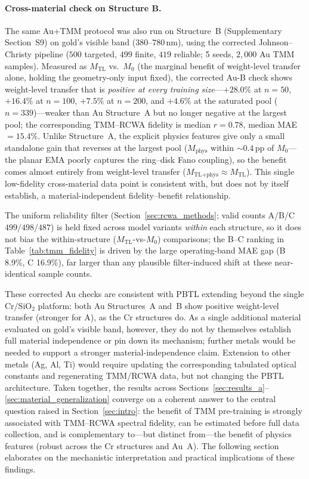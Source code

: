 \documentclass[a4paper,fleqn]{cas-sc}
\newcommand{\Mzero}{M_0}
\newcommand{\Mphys}{M_\text{phys}}
\newcommand{\Mtl}{M_\text{TL}}
\newcommand{\Mtlphys}{M_\text{TL+phys}}
\begin{document}
\paragraph{Cross-material check on Structure B.} The same Au+TMM protocol was also run on Structure~B (Supplementary Section~S9) on gold's visible band ($380$--$780$\,nm), using the corrected Johnson--Christy pipeline ($500$ targeted, $499$ finite, $419$ reliable; 5 seeds, $2{,}000$ Au TMM samples). Measured as $\Mtl$ vs.\ $\Mzero$ (the marginal benefit of weight-level transfer alone, holding the geometry-only input fixed), the corrected Au-B check shows weight-level transfer that is \emph{positive at every training size}---$+28.0\%$ at $n{=}50$, $+16.4\%$ at $n{=}100$, $+7.5\%$ at $n{=}200$, and $+4.6\%$ at the saturated pool ($n{=}339$)---weaker than Au Structure~A but no longer negative at the largest pool; the corresponding TMM--RCWA fidelity is median $r=0.78$, median MAE $=15.4\%$. Unlike Structure~A, the explicit physics features give only a small standalone gain that reverses at the largest pool ($\Mphys$ within ${\sim}0.4$\,pp of $\Mzero$---the planar EMA poorly captures the ring--disk Fano coupling), so the benefit comes almost entirely from weight-level transfer ($\Mtlphys \approx \Mtl$). This single low-fidelity cross-material data point is consistent with, but does not by itself establish, a material-independent fidelity--benefit relationship.

The uniform reliability filter (Section~\ref{sec:rcwa_methods}; valid counts A/B/C $499/498/487$) is held fixed across model variants \emph{within} each structure, so it does not bias the within-structure ($\Mtl$-vs-$\Mzero$) comparisons; the B--C ranking in Table~\ref{tab:tmm_fidelity} is driven by the large operating-band MAE gap (B 8.9\%, C 16.9\%), far larger than any plausible filter-induced shift at these near-identical sample counts.

These corrected Au checks are consistent with PBTL extending beyond the single Cr/SiO$_2$ platform: both Au Structures~A and~B show positive weight-level transfer (stronger for A), as the Cr structures do. As a single additional material evaluated on gold's visible band, however, they do not by themselves establish full material independence or pin down its mechanism; further metals would be needed to support a stronger material-independence claim. Extension to other metals (Ag, Al, Ti) would require updating the corresponding tabulated optical constants and regenerating TMM/RCWA data, but not changing the PBTL architecture. Taken together, the results across Sections~\ref{sec:results_a}--\ref{sec:material_generalization} converge on a coherent answer to the central question raised in Section~\ref{sec:intro}: the benefit of TMM pre-training is strongly associated with TMM--RCWA spectral fidelity, can be estimated before full data collection, and is complementary to---but distinct from---the benefit of physics features (robust across the Cr structures and Au~A). The following section elaborates on the mechanistic interpretation and practical implications of these findings.
\end{document}
